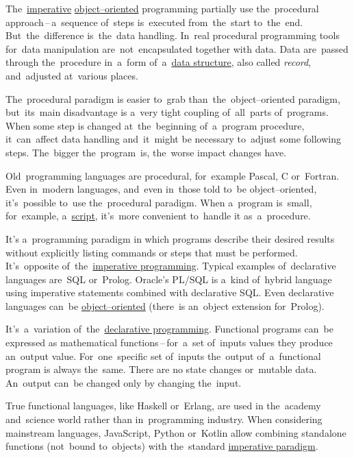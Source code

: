The~\hyperref[imperativeprogramming]{imperative} \hyperref[objectorientedprogramming]{object--oriented} programming partially use the~procedural approach\,--\,a~sequence of~steps is~executed from~the~start to~the~end.
But~the~difference is~the~data handling.
In~real procedural programming tools for~data manipulation are~not~encapsulated together with data.
Data are~passed through the~procedure in~a~form of~a~\hyperref[objectdatastructure]{data structure}, also called \textit{record}, and~adjusted at~various places.

The~procedural paradigm is easier to~grab than~the~object--oriented paradigm, but~its~main disadvantage is a~very tight coupling of~all~parts of~programs.
When some step is changed at~the~beginning of~a~program procedure, it~can~affect data handling and~it~might be necessary to~adjust some following steps.
The~bigger the~program~is, the~worse impact changes have.

Old~programming languages are procedural, for~example Pascal, C or~Fortran.
Even in~modern languages, and~even in~those told to~be object--oriented, it's~possible to~use the~procedural paradigm.
When a~program is~small, for~example, a~\hyperref[scriptinglanguages]{script}, it's~more convenient to~handle it as~a~procedure.

\label{declarativeprogramming}
It's a~programming paradigm in which programs describe their desired results without explicitly listing commands or steps that must be performed.
It's~opposite of~the~\hyperref[imperativeprogramming]{imperative programming}.
Typical examples of~declarative languages are~SQL or~Prolog.
Oracle's PL/SQL is a~kind of~hybrid language using imperative statements combined with declarative SQL\@.
Even declarative languages can~be \hyperref[objectorientedprogramming]{object--oriented} (there~is an~object extension for~Prolog).

\label{functionalprogramming}
It's~a~variation of~the~\hyperref[declarativeprogramming]{declarative programming}.
Functional programs can~be expressed as mathematical functions\,--\,for~a~set of~inputs values they produce an~output value.
For~one~specific set of~inputs the~output of~a~functional program is always the~same.
There are no state changes or~mutable data.
An~output can~be changed only by changing the~input.

True functional languages, like Haskell or~Erlang, are used in the~academy and~science world rather than in~programming industry.
When considering mainstream languages, JavaScript, Python or~Kotlin allow combining standalone functions (not~bound to~objects) with the~standard \hyperref[imperativeprogramming]{imperative paradigm}.

